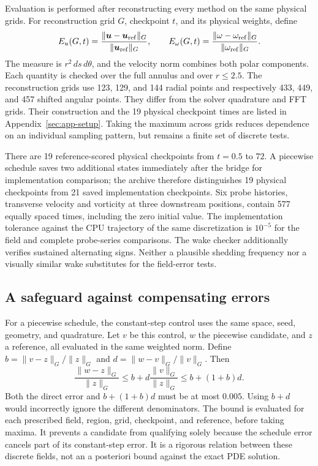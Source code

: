 Evaluation is performed after reconstructing every method on the same physical grids. For reconstruction grid $G$, checkpoint $t$, and its physical weights, define
\begin{equation}
\label{eq:field-errors}
 E_u(G,t)=\frac{\|\boldsymbol u-\boldsymbol u_{\rm ref}\|_G}{\|\boldsymbol u_{\rm ref}\|_G},\qquad
 E_\omega(G,t)=\frac{\|\omega-\omega_{\rm ref}\|_G}{\|\omega_{\rm ref}\|_G}.
\end{equation}
The measure is $r^2\,ds\,d\theta$, and the velocity norm combines both polar components. Each quantity is checked over the full annulus and over $r\leq2.5$. The reconstruction grids use 123, 129, and 144 radial points and respectively 433, 449, and 457 shifted angular points. They differ from the solver quadrature and FFT grids. Their construction and the 19 physical checkpoint times are listed in Appendix~\ref{sec:app-setup}. Taking the maximum across grids reduces dependence on an individual sampling pattern, but remains a finite set of discrete tests.

There are 19 reference-scored physical checkpoints from $t=0.5$ to $72$. A piecewise schedule saves two additional states immediately after the bridge for implementation comparison; the archive therefore distinguishes 19 physical checkpoints from 21 saved implementation checkpoints. Six probe histories, transverse velocity and vorticity at three downstream positions, contain 577 equally spaced times, including the zero initial value. The implementation tolerance against the CPU trajectory of the same discretization is $10^{-5}$ for the field and complete probe-series comparisons. The wake checker additionally verifies sustained alternating signs. Neither a plausible shedding frequency nor a visually similar wake substitutes for the field-error tests.

\subsection{A safeguard against compensating errors}

For a piecewise schedule, the constant-step control uses the same space, seed, geometry, and quadrature. Let $v$ be this control, $w$ the piecewise candidate, and $z$ a reference, all evaluated in the same weighted norm. Define $b=\|v-z\|_G/\|z\|_G$ and $d=\|w-v\|_G/\|v\|_G$. Then
\begin{equation}
\label{eq:triangle-guard}
 \frac{\|w-z\|_G}{\|z\|_G}
 \leq b+d\frac{\|v\|_G}{\|z\|_G}
 \leq b+(1+b)d.
\end{equation}
Both the direct error and $b+(1+b)d$ must be at most $0.005$. Using $b+d$ would incorrectly ignore the different denominators. The bound is evaluated for each prescribed field, region, grid, checkpoint, and reference, before taking maxima. It prevents a candidate from qualifying solely because the schedule error cancels part of its constant-step error. It is a rigorous relation between these discrete fields, not an a posteriori bound against the exact PDE solution.

